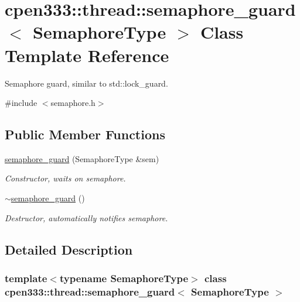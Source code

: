 \hypertarget{classcpen333_1_1thread_1_1semaphore__guard}{}\section{cpen333\+:\+:thread\+:\+:semaphore\+\_\+guard$<$ Semaphore\+Type $>$ Class Template Reference}
\label{classcpen333_1_1thread_1_1semaphore__guard}


Semaphore guard, similar to std\+::lock\+\_\+guard.  




{\ttfamily \#include $<$semaphore.\+h$>$}

\subsection*{Public Member Functions}
\begin{DoxyCompactItemize}
\item 
\hyperlink{classcpen333_1_1thread_1_1semaphore__guard_a0704e609f573247313eb66722b6ff145}{semaphore\+\_\+guard} (Semaphore\+Type \&sem)
\begin{DoxyCompactList}\small\item\em Constructor, waits on semaphore. \end{DoxyCompactList}\item 
\mbox{\label{classcpen333_1_1thread_1_1semaphore__guard_a385daa9ae4e31be8403fda90fb57cdd8}} 
\hyperlink{classcpen333_1_1thread_1_1semaphore__guard_a385daa9ae4e31be8403fda90fb57cdd8}{$\sim$semaphore\+\_\+guard} ()
\begin{DoxyCompactList}\small\item\em Destructor, automatically notifies semaphore. \end{DoxyCompactList}\end{DoxyCompactItemize}


\subsection{Detailed Description}
\subsubsection*{template$<$typename Semaphore\+Type$>$\newline
class cpen333\+::thread\+::semaphore\+\_\+guard$<$ Semaphore\+Type $>$}

